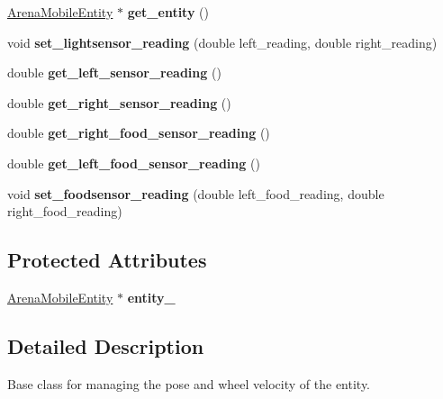 \begin{DoxyCompactItemize}
\mbox{\label{class_motion_handler_ad8472612d15be1ada7f919f45d245adc}} 
\mbox{\hyperlink{class_arena_mobile_entity}{Arena\+Mobile\+Entity}} $\ast$ {\bfseries get\+\_\+entity} ()
\item 
\mbox{\label{class_motion_handler_a96451327dddb6a7d7eef689498abbde2}} 
void {\bfseries set\+\_\+lightsensor\+\_\+reading} (double left\+\_\+reading, double right\+\_\+reading)
\item 
\mbox{\label{class_motion_handler_ab7959aa3946b9a91570a990e0350f538}} 
double {\bfseries get\+\_\+left\+\_\+sensor\+\_\+reading} ()
\item 
\mbox{\label{class_motion_handler_ac97d180150dade9601bbed25a248f150}} 
double {\bfseries get\+\_\+right\+\_\+sensor\+\_\+reading} ()
\item 
\mbox{\label{class_motion_handler_a2fadcc5b46f73af637732ffc35e0a9a9}} 
double {\bfseries get\+\_\+right\+\_\+food\+\_\+sensor\+\_\+reading} ()
\item 
\mbox{\label{class_motion_handler_a23c4bc0d6ce0657c7007c59380bf2d48}} 
double {\bfseries get\+\_\+left\+\_\+food\+\_\+sensor\+\_\+reading} ()
\item 
\mbox{\label{class_motion_handler_ad3d6d67491b4b06fc85902a12cc21699}} 
void {\bfseries set\+\_\+foodsensor\+\_\+reading} (double left\+\_\+food\+\_\+reading, double right\+\_\+food\+\_\+reading)
\end{DoxyCompactItemize}
\subsection*{Protected Attributes}
\begin{DoxyCompactItemize}
\item 
\mbox{\label{class_motion_handler_a659fd1ec8878260a63779bf45681f5a4}} 
\mbox{\hyperlink{class_arena_mobile_entity}{Arena\+Mobile\+Entity}} $\ast$ {\bfseries entity\+\_\+}
\end{DoxyCompactItemize}


\subsection{Detailed Description}
Base class for managing the pose and wheel velocity of the entity. 


